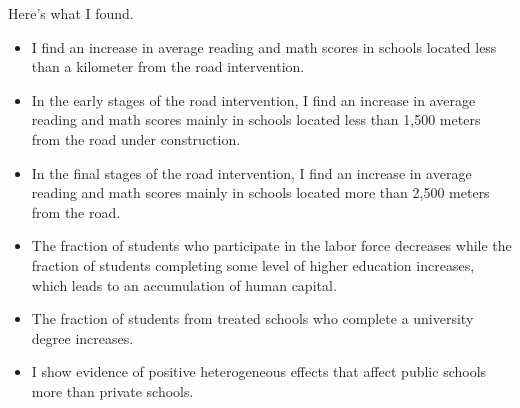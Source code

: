 \documentclass[9pt]{beamer}
\begin{document}
\begin{frame}{Here's what I found.}
    \begin{itemize}
    \item   I find an increase in average reading and math scores in schools located less than a kilometer from the road intervention.
    \item In the early stages of  the road intervention, I find an increase in average reading and math scores mainly in schools located less than 1,500 meters from the road under construction.
    \item   In the final stages of the road intervention, I find an increase in average reading and math scores mainly in schools located more than 2,500 meters from the road.

    \item   The fraction of students who participate in the labor force decreases while the fraction of students completing some level of higher education increases, which leads to an accumulation of human capital.
    \item   The fraction of students from treated schools who complete a university degree increases. 
    \item   I show evidence of positive heterogeneous effects that affect public schools more than private schools.
 \end{itemize}
\end{frame}
 
 

\end{document}
